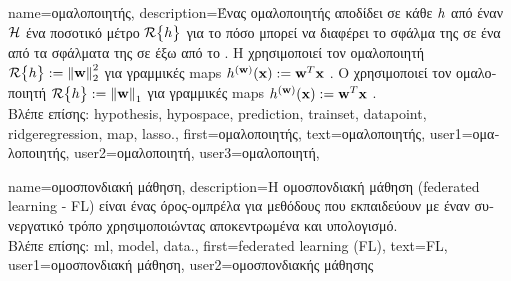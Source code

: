 {name={\foreignlanguage{greek}{ομαλοποιητής}}, 
	description={\foreignlanguage{greek}{Ένας ομαλοποιητής αποδίδει σε κάθε}  
		 $h$ \foreignlanguage{greek}{από έναν}  $\mathcal{H}$ 
		\foreignlanguage{greek}{ένα ποσοτικό μέτρο $\mathcal{R}\big\{ h \big\}$ για το πόσο μπορεί να διαφέρει το σφάλμα} 
		 \foreignlanguage{greek}{της σε ένα}  \foreignlanguage{greek}{από τα σφάλματα} 
		 \foreignlanguage{greek}{της σε}  \foreignlanguage{greek}{έξω από το} 
		. \foreignlanguage{greek}{Η}  \foreignlanguage{greek}{χρησιμοποιεί τον 
		ομαλοποιητή $\mathcal{R}\big\{ h \big\} := \left\Vert {{\bf w}} \right\Vert_{2}^{2}$ για γραμμικές} \gls{map}s  
		$h^{({\bf w})}({\bf x}) := {\bf w}^{T} {\bf x}$ \cite[\foreignlanguage{greek}{Κεφ.} 3]{MLBasics}. 
		\foreignlanguage{greek}{Ο}  \foreignlanguage{greek}{χρησιμοποιεί τον ομαλοποιητή 
		$\mathcal{R}\big\{ h \big\} := \left\Vert {{\bf w}} \right\Vert_{1}$ για γραμμικές} \gls{map}s  
		$h^{({\bf w})}({\bf x}) := {\bf w}^{T} {\bf x}$ \cite[\foreignlanguage{greek}{Κεφ.} 3]{MLBasics}.\\
		\foreignlanguage{greek}{Βλέπε επίσης:} \gls{hypothesis}, \gls{hypospace}, \gls{prediction}, \gls{trainset}, \gls{datapoint}, 
		\gls{ridgeregression}, \gls{map}, \gls{lasso}.},
	first={\foreignlanguage{greek}{ομαλοποιητής}},
	text={\foreignlanguage{greek}{ομαλοποιητής}},
	user1={\foreignlanguage{greek}{ομαλοποιητής}}, %
 	user2={\foreignlanguage{greek}{ομαλοποιητή}}, %
 	user3={\foreignlanguage{greek}{ομαλοποιητή}}, %
}

{name={\foreignlanguage{greek}{ομοσπονδιακή μάθηση}}, 
	description={\foreignlanguage{greek}{Η ομοσπονδιακή μάθηση} 
		(federated learning - FL) \foreignlanguage{greek}{είναι ένας όρος-ομπρέλα για μεθόδους}  
		\foreignlanguage{greek}{που εκπαι\-δεύ\-ουν}  \foreignlanguage{greek}{με έναν συνεργατικό
		τρόπο χρησιμοποιώντας αποκεντρωμένα}  \foreignlanguage{greek}{και υπολογισμό}.\\
		\foreignlanguage{greek}{Βλέπε επίσης:} \gls{ml}, \gls{model}, \gls{data}.},
	first={federated learning (FL)},
	text={FL}, 
	user1={\foreignlanguage{greek}{ομοσπονδιακή μάθηση}}, %
  	user2={\foreignlanguage{greek}{ομοσπονδιακής μάθησης}} %
}

